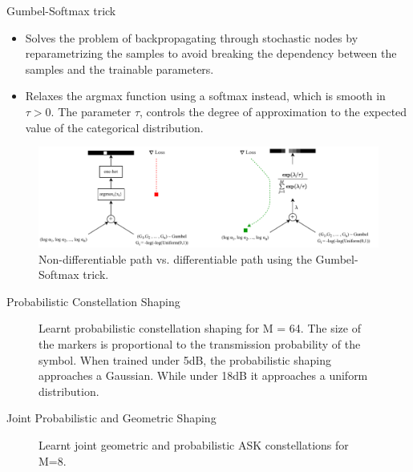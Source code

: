 \documentclass[english,aspectratio=1610,9pt,helvet,nicetitles]{ICEbeamerTUMCD}
\begin{document}
\begin{frame}{Gumbel-Softmax trick \cite{JANG}}
\begin{itemize}
\item Solves the problem of backpropagating through stochastic nodes by reparametrizing the samples to avoid breaking the dependency between the samples and the trainable parameters.
\item Relaxes the argmax function using a softmax instead, which is smooth in $\tau > 0$. The parameter $\tau$, controls the degree of approximation to the expected value of the categorical distribution.
\end{itemize}
\begin{figure}
\includegraphics[width=0.85\columnwidth]{ressources/Gumbel_Softmax.pdf}
\caption{ Non-differentiable path vs. differentiable path using the Gumbel-Softmax trick. }
\end{figure}
\end{frame}

\begin{frame}{Probabilistic Constellation Shaping}
\begin{figure}
	\subfigure[5dB]{
		
		\label{subfig:stark_pcs_5db}
	}
	\subfigure[18db]{
		
		\label{subfig:stark_pcs_18db}
	}
	\caption{Learnt probabilistic constellation shaping for M = 64. The size of the markers is proportional to the transmission probability of the symbol. When trained under 5dB, the probabilistic shaping approaches a Gaussian. While under 18dB it approaches a uniform distribution. }
\end{figure}
\end{frame}

\begin{frame}{Joint Probabilistic and Geometric Shaping}
\begin{figure}[h]
	\subfigure[SNR = 5dB]{
         
         \label{subfig:stark5dB}
    }
    \subfigure[SNR = 18dB]{
         
         \label{subfig:stark18dB}
    }
    \caption{Learnt joint geometric and probabilistic ASK constellations for M=8.}
    \label{fig:starkMASK}
\end{figure}

\end{frame}
\end{document}
